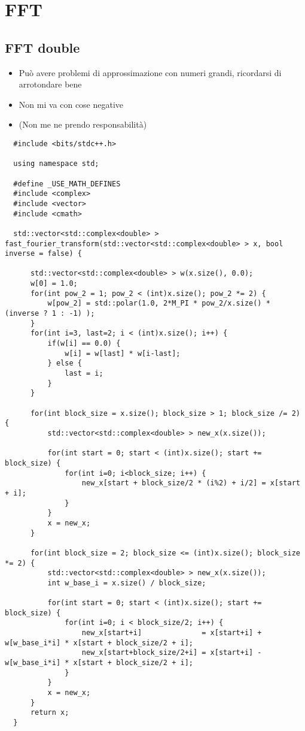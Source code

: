 \section{FFT}

\subsection{FFT double}
\begin{itemize}
    \item Può avere problemi di approssimazione con numeri grandi, ricordarsi di arrotondare bene
    \item Non mi va con cose negative
    \item (Non me ne prendo responsabilità)
\end{itemize}
\begin{lstlisting}
  #include <bits/stdc++.h>

  using namespace std;

  #define _USE_MATH_DEFINES
  #include <complex>
  #include <vector>
  #include <cmath>

  std::vector<std::complex<double> > fast_fourier_transform(std::vector<std::complex<double> > x, bool inverse = false) {

      std::vector<std::complex<double> > w(x.size(), 0.0);
      w[0] = 1.0;
      for(int pow_2 = 1; pow_2 < (int)x.size(); pow_2 *= 2) {
          w[pow_2] = std::polar(1.0, 2*M_PI * pow_2/x.size() * (inverse ? 1 : -1) );
      }
      for(int i=3, last=2; i < (int)x.size(); i++) {
          if(w[i] == 0.0) {
              w[i] = w[last] * w[i-last];
          } else {
              last = i;
          }
      }

      for(int block_size = x.size(); block_size > 1; block_size /= 2) {
          std::vector<std::complex<double> > new_x(x.size());

          for(int start = 0; start < (int)x.size(); start += block_size) {
              for(int i=0; i<block_size; i++) {
                  new_x[start + block_size/2 * (i%2) + i/2] = x[start + i];
              }
          }
          x = new_x;
      }

      for(int block_size = 2; block_size <= (int)x.size(); block_size *= 2) {
          std::vector<std::complex<double> > new_x(x.size());
          int w_base_i = x.size() / block_size;

          for(int start = 0; start < (int)x.size(); start += block_size) {
              for(int i=0; i < block_size/2; i++) {
                  new_x[start+i]              = x[start+i] + w[w_base_i*i] * x[start + block_size/2 + i];
                  new_x[start+block_size/2+i] = x[start+i] - w[w_base_i*i] * x[start + block_size/2 + i];
              }
          }
          x = new_x;
      }
      return x;
  }
  

\end{lstlisting}
